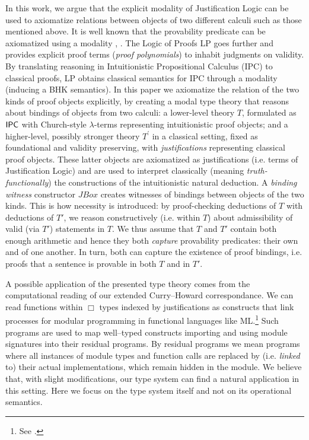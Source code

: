 \documentclass[11pt]{eptcs} %
\begin{document}
In this work, we argue that the explicit modality of Justification Logic \cite{DBLP:conf/jelia/Artemov08} can be used to axiomatize relations between objects of two different calculi such as those mentioned above.  It is well known that the provability predicate can be axiomatized using a modality \cite{citeulike:214701}, \cite{ArtBek05HPL}. The Logic of Proofs {\sf LP} \cite{Art94APAL} goes further and provides explicit proof terms (\textit{proof polynomials}) to inhabit judgments on validity. By translating reasoning in Intuitionistic Propositional Calculus ({\sf IPC}) to classical proofs, {\sf LP} obtains classical semantics for {\sf IPC} through a modality (inducing a {\sf BHK} semantics). In this paper we axiomatize the relation of the two kinds of proof objects explicitly, by creating a modal type theory that reasons about bindings of objects from two calculi: a lower-level theory $T$, formulated as ${\sf IPC}$ with Church-style $\lambda$-terms representing intuitionistic proof objects; and a higher-level, possibly stronger theory $T^\prime$ in a classical setting, fixed as foundational and validity preserving, with \textit{justifications} representing classical proof objects. These latter objects are axiomatized as justifications (i.e. terms of Justification Logic) and are used to interpret classically (meaning \textit{truth-functionally}) the constructions of the intuitionistic natural deduction.
A \textit{binding witness} constructor {\sf $JBox$}  creates witnesses of bindings between objects of the two kinds. This is how necessity is introduced: by proof-checking deductions of $T$ with deductions of $T'$,  we reason constructively (i.e. within $T$) about admissibility of valid (via $T'$) statements in $T$. We thus assume that $T$ and $T'$ contain both enough arithmetic and hence they both \textit{capture} provability predicates: their own and of one another. In turn, both can capture the existence of proof bindings, i.e. proofs that a sentence is provable in both $T$ and in $T'$.

A possible application of the presented type theory comes from the computational reading of our extended Curry--Howard correspondance. We can read functions within $\Box$ types indexed by justifications as constructs that link processes for modular programming in functional languages like {\sf ML}.\footnote{See \cite{Harper98programmingin}.} Such programs are used to map well--typed constructs importing and using module signatures into their residual programs. By residual programs we mean programs where all instances of module types and  function calls are replaced by (i.e. \textit{linked} to) their actual implementations, which remain hidden in the module. We believe that, with slight modifications, our type system can find a natural application in this setting. Here we focus on the type system itself and not on its operational semantics. 
\end{document}
